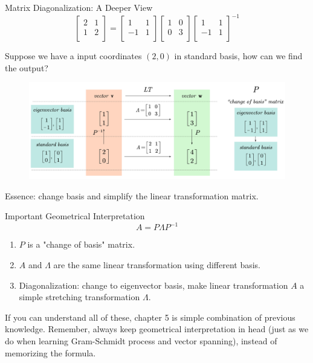 \documentclass{beamer}
\begin{document}
\begin{frame}{Matrix Diagonalization: A Deeper View}
    \begin{equation*}
        \left[ \begin{matrix}
            2&		1\\
            1&		2\\
        \end{matrix} \right] =\left[ \begin{matrix}
            1&		1\\
            -1&		1\\
        \end{matrix} \right] \left[ \begin{matrix}
            1&		0\\
            0&		3\\
        \end{matrix} \right] \left[ \begin{matrix}
            1&		1\\
            -1&		1\\
        \end{matrix} \right] ^{-1}
    \end{equation*}

Suppose we have a input coordinates $(2,0)$ in standard basis, how can we find the output?
\begin{figure}
    \centering
    \includegraphics[width=\textwidth]{PNP-1.jpg}
\end{figure}

Essence: change basis and simplify the linear transformation matrix.
\end{frame}

\begin{frame}{Important Geometrical Interpretation}
    \begin{equation*}
        A=P\varLambda P^{-1}
    \end{equation*}
\begin{enumerate}
    \item $P$ is a "change of basis" matrix.
    \item $A$ and $\Lambda $ are the same linear transformation using different basis.
    \item Diagonalization: change to eigenvector basis, make linear transformation $A$ a simple stretching transformation $\Lambda$.
\end{enumerate}

If you can understand all of these, chapter 5 is simple combination of previous knowledge. Remember, always keep geometrical interpretation in head (just as we do when learning Gram-Schmidt process and vector spanning), instead of memorizing the formula.
\end{frame}
\end{document}
